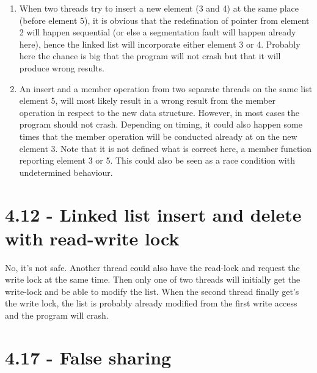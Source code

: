 \documentclass[a4paper,11pt,twoside]{article}
\begin{document}
\begin{enumerate}[label={\alph*)}]
\item When two threads try to insert a new element (3 and 4) at the same place (before element 5), it is obvious that the redefination of pointer from element 2 will happen sequential (or else a segmentation fault will happen already here), hence the linked list will incorporate either element 3 or 4. Probably here the chance is big that the program will not crash but that it will produce wrong results.

  \item An insert and a member operation from two separate threads on the same list element 5, will most likely result in a wrong result from the member operation in respect to the new data structure. However, in most cases the program should not crash. Depending on timing, it could also happen some times that the member operation will be conducted already at on the new element 3. Note that it is not defined what is correct here, a member function reporting element 3 or 5. This could also be seen as a race condition with undetermined behaviour.
\end{enumerate}





\section{4.12 - Linked list insert and delete with read-write lock}
No, it's not safe. Another thread could also have the read-lock and request the write lock at the same time. Then only one of two threads will initially get the write-lock and be able to modify the list. When the second thread finally get's the write lock, the list is probably already modified from the first write access and the program will crash.

\section{4.17 - False sharing}
\end{document}
